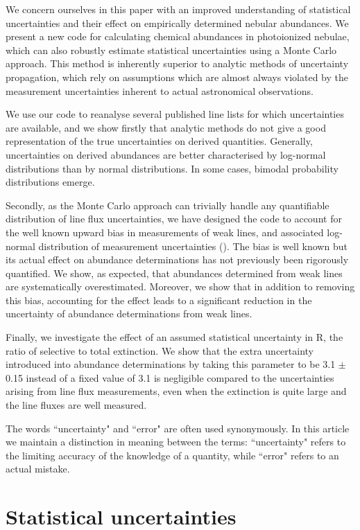\documentclass[useAMS,usenatbib]{mn2e}
\begin{document}
We concern ourselves in this paper with an improved understanding of statistical uncertainties and their effect on empirically determined nebular abundances.  We present a new code for calculating chemical abundances in photoionized nebulae, which can also robustly estimate statistical uncertainties using a Monte Carlo approach.  This method is inherently superior to analytic methods of uncertainty propagation, which rely on assumptions which are almost always violated by the measurement uncertainties inherent to actual astronomical observations.

We use our code to reanalyse several published line lists for which uncertainties are available, and we show firstly that analytic methods do not give a good representation of the true uncertainties on derived quantities.  Generally, uncertainties on derived abundances are better characterised by log-normal distributions than by normal distributions.  In some cases, bimodal probability distributions emerge.

Secondly, as the Monte Carlo approach can trivially handle any quantifiable distribution of line flux uncertainties, we have designed the code to account for the well known upward bias in measurements of weak lines, and associated log-normal distribution of measurement uncertainties (\citet{1994A&A...287..676R}).  The bias is well known but its actual effect on abundance determinations has not previously been rigorously quantified.  We show, as expected, that abundances determined from weak lines are systematically overestimated.  Moreover, we show that in addition to removing this bias, accounting for the effect leads to a significant reduction in the uncertainty of abundance determinations from weak lines.

Finally, we investigate the effect of an assumed statistical uncertainty in R, the ratio of selective to total extinction.  We show that the extra uncertainty introduced into abundance determinations by taking this parameter to be 3.1 $\pm$ 0.15 instead of a fixed value of 3.1 is negligible compared to the uncertainties arising from line flux measurements, even when the extinction is quite large and the line fluxes are well measured.

The words ``uncertainty" and ``error" are often used synonymously.  In this article we maintain a distinction in meaning between the terms: ``uncertainty" refers to the limiting accuracy of the knowledge of a quantity, while ``error" refers to an actual mistake.

\section{Statistical uncertainties}
\end{document}
